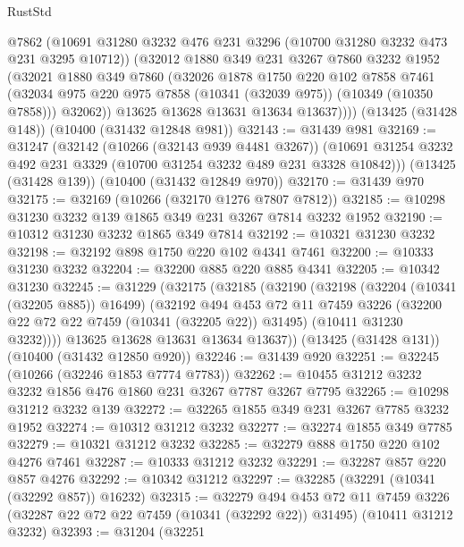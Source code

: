\begin{lexlean}{RustStd}
\begin{coremodule}
{\begin{coremodule}
{{{{{{{{{{{{{{{{{{{{{{{{{          @7862
          (@10691 @31280 @3232 @476 @231 @3296 (@10700 @31280 @3232 @473 @231 @3295 @10712))
          (@32012
            @1880
            @349
            @231
            @3267
            @7860
            @3232
            @1952
            (@32021
              @1880
              @349
              @7860
              (@32026
                @1878
                @1750
                @220
                @102
                @7858
                @7461
                (@32034 @975 @220 @975 @7858 (@10341 (@32039 @975)) (@10349 (@10350 @7858)))
                @32062))
            @13625
            @13628
            @13631
            @13634
            @13637))))
    (@13425 (@31428 @148))
    (@10400 (@31432 @12848 @981))
@32143 := @31439 @981
@32169 := @31247
    (@32142
      (@10266 (@32143 @939 @4481 @3267))
      (@10691 @31254 @3232 @492 @231 @3329 (@10700 @31254 @3232 @489 @231 @3328 @10842)))
    (@13425 (@31428 @139))
    (@10400 (@31432 @12849 @970))
@32170 := @31439 @970
@32175 := @32169 (@10266 (@32170 @1276 @7807 @7812))
@32185 := @10298 @31230 @3232 @139 @1865 @349 @231 @3267 @7814 @3232 @1952
@32190 := @10312 @31230 @3232 @1865 @349 @7814
@32192 := @10321 @31230 @3232
@32198 := @32192 @898 @1750 @220 @102 @4341 @7461
@32200 := @10333 @31230 @3232
@32204 := @32200 @885 @220 @885 @4341
@32205 := @10342 @31230
@32245 := @31229
    (@32175
      (@32185
        (@32190
          (@32198
            (@32204 (@10341 (@32205 @885)) @16499)
            (@32192
              @494
              @453
              @72
              @11
              @7459
              @3226
              (@32200 @22 @72 @22 @7459 (@10341 (@32205 @22)) @31495)
              (@10411 @31230 @3232))))
        @13625
        @13628
        @13631
        @13634
        @13637))
    (@13425 (@31428 @131))
    (@10400 (@31432 @12850 @920))
@32246 := @31439 @920
@32251 := @32245 (@10266 (@32246 @1853 @7774 @7783))
@32262 := @10455 @31212 @3232 @3232 @1856 @476 @1860 @231 @3267 @7787 @3267 @7795
@32265 := @10298 @31212 @3232 @139
@32272 := @32265 @1855 @349 @231 @3267 @7785 @3232 @1952
@32274 := @10312 @31212 @3232
@32277 := @32274 @1855 @349 @7785
@32279 := @10321 @31212 @3232
@32285 := @32279 @888 @1750 @220 @102 @4276 @7461
@32287 := @10333 @31212 @3232
@32291 := @32287 @857 @220 @857 @4276
@32292 := @10342 @31212
@32297 := @32285 (@32291 (@10341 (@32292 @857)) @16232)
@32315 := @32279
    @494
    @453
    @72
    @11
    @7459
    @3226
    (@32287 @22 @72 @22 @7459 (@10341 (@32292 @22)) @31495)
    (@10411 @31212 @3232)
@32393 := @31204
    (@32251
}}}}}}}}}}}}}}}}}}}}}}}}}
\end{coremodule}}
\end{coremodule}
\end{lexlean}
